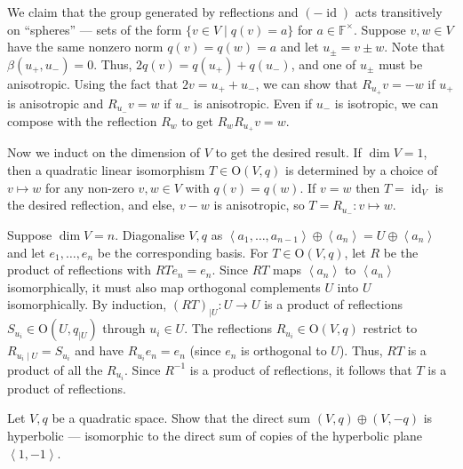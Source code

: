 \documentclass[12 pt, letterpaper]{hmcpset}
\begin{document}
\begin{solution}
	We claim that the group generated by reflections and $(- \operatorname{id})$ acts transitively on ``spheres'' --- sets of the form $\{ v \in V \mid q(v) = a \}$ for $a \in \mathbb{F}^{\times}$. Suppose $v, w \in V$ have the same nonzero norm $q(v) = q(w) = a$ and let $u_{\pm} = v \pm w$. Note that $\beta(u_{+}, u_{-}) = 0$. Thus, $2 q(v) = q(u_{+}) + q(u_{-})$, and one of $u_{\pm}$ must be anisotropic. Using the fact that $2v = u_{+} + u_{-}$, we can show that $R_{u_{+}} v = - w$ if $u_{+}$ is anisotropic and $R_{u_{-}} v = w$ if $u_{-}$ is anisotropic. Even if $u_{-}$ is isotropic, we can compose with the reflection $R_{w}$ to get $R_{w}R_{u_{+}} v = w$.

	Now we induct on the dimension of $V$ to get the desired result. If $\dim V = 1$, then a quadratic linear isomorphism $T \in \mathrm{O}(V, q)$ is determined by a choice of $v \mapsto w$ for any non-zero $v, w \in V$ with $q(v) = q(w)$. If $v = w$ then $T = \operatorname{id}_{V}$ is the desired reflection, and else, $v - w$ is anisotropic, so $T = R_{u_{-}} : v \mapsto w$.

	Suppose $\dim V = n$. Diagonalise $V, q$ as $\left < a_{1}, \dots, a_{n - 1} \right > \oplus \left < a_{n} \right > = U \oplus \left < a_{n} \right >$ and let $e_{1}, \dots, e_{n}$ be the corresponding basis. For $T \in \mathrm{O}(V, q)$, let $R$ be the product of reflections with $R T e_{n} = e_{n}$. Since $RT$ maps $\left < a_{n} \right >$ to $\left < a_{n} \right >$ isomorphically, it must also map orthogonal complements $U$ into $U$ isomorphically. By induction, $(RT)_{\mid U} : U \to U$ is a product of reflections $S_{u_{i}} \in \mathrm{O}(U, q_{\mid U})$ through $u_{i} \in U$. The reflections $R_{u_{i}} \in \mathrm{O}(V, q)$ restrict to $R_{u_{i} \mid U} = S_{u_{i}}$ and have $R_{u_{i}} e_{n} = e_{n}$ (since $e_{n}$ is orthogonal to $U$). Thus, $RT$ is a product of all the $R_{u_{i}}$. Since $R^{-1}$ is a product of reflections, it follows that $T$ is a product of reflections.
\end{solution}

\pagebreak

\begin{problem}[(3)]
	Let $V, q$ be a quadratic space. Show that the direct sum $(V, q) \oplus (V, -q)$ is hyperbolic --- isomorphic to the direct sum of copies of the hyperbolic plane $\left < 1, -1 \right >$.
\end{problem}
\end{document}
